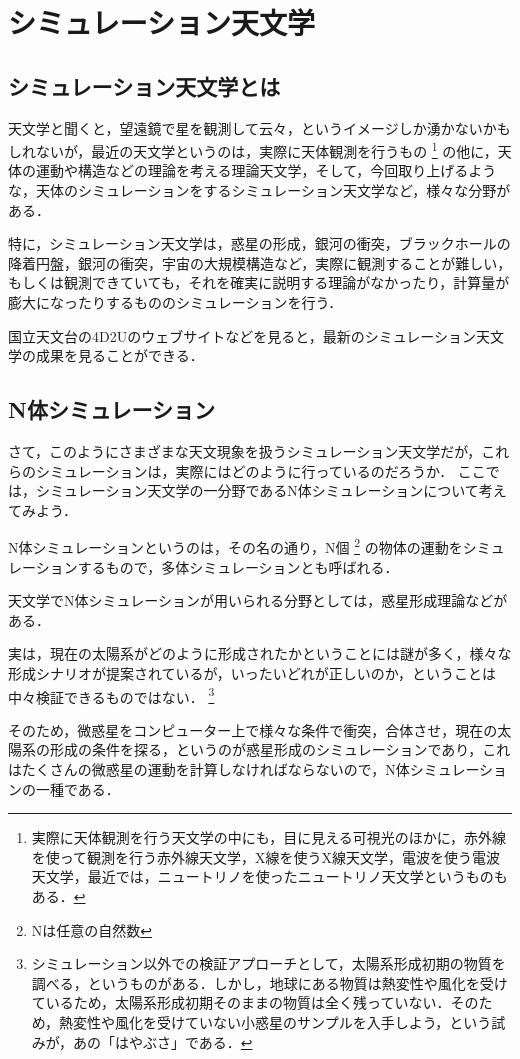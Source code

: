 \chapter{シミュレーション天文学}

\section{シミュレーション天文学とは}
天文学と聞くと，望遠鏡で星を観測して云々，というイメージしか湧かないかもしれないが，最近の天文学というのは，実際に天体観測を行うもの
\footnote{実際に天体観測を行う天文学の中にも，目に見える可視光のほかに，赤外線を使って観測を行う赤外線天文学，X線を使うX線天文学，電波を使う電波天文学，最近では，ニュートリノを使ったニュートリノ天文学というものもある．}
の他に，天体の運動や構造などの理論を考える理論天文学，そして，今回取り上げるような，天体のシミュレーションをするシミュレーション天文学など，様々な分野がある．


特に，シミュレーション天文学は，惑星の形成，銀河の衝突，ブラックホールの降着円盤，銀河の衝突，宇宙の大規模構造など，実際に観測することが難しい，もしくは観測できていても，それを確実に説明する理論がなかったり，計算量が膨大になったりするもののシミュレーションを行う．

国立天文台の4D2Uのウェブサイトなどを見ると，最新のシミュレーション天文学の成果を見ることができる．

\section{N体シミュレーション}
さて，このようにさまざまな天文現象を扱うシミュレーション天文学だが，これらのシミュレーションは，実際にはどのように行っているのだろうか．
ここでは，シミュレーション天文学の一分野であるN体シミュレーションについて考えてみよう．


N体シミュレーションというのは，その名の通り，N個
\footnote{Nは任意の自然数}
の物体の運動をシミュレーションするもので，多体シミュレーションとも呼ばれる．


天文学でN体シミュレーションが用いられる分野としては，惑星形成理論などがある．

実は，現在の太陽系がどのように形成されたかということには謎が多く，様々な形成シナリオが提案されているが，いったいどれが正しいのか，ということは中々検証できるものではない．
\footnote{シミュレーション以外での検証アプローチとして，太陽系形成初期の物質を調べる，というものがある．しかし，地球にある物質は熱変性や風化を受けているため，太陽系形成初期そのままの物質は全く残っていない．そのため，熱変性や風化を受けていない小惑星のサンプルを入手しよう，という試みが，あの「はやぶさ」である．}

そのため，微惑星をコンピューター上で様々な条件で衝突，合体させ，現在の太陽系の形成の条件を探る，というのが惑星形成のシミュレーションであり，これはたくさんの微惑星の運動を計算しなければならないので，N体シミュレーションの一種である．
